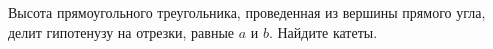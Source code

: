 \begin{ex}
	\begin{condition}
		Высота прямоугольного треугольника, проведенная	из вершины прямого угла, делит гипотенузу на отрезки, равные \( a  \) и \( b \). Найдите катеты.
	\end{condition}
\end{ex}